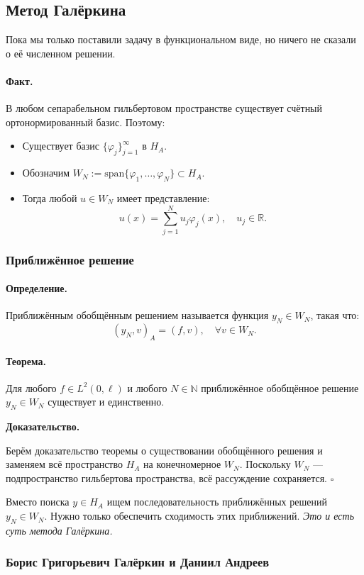 \subsection{Метод Галёркина}
Пока мы только поставили задачу в функциональном виде, но ничего не сказали о её численном решении.
\paragraph{Факт.} В любом сепарабельном гильбертовом пространстве существует счётный ортонормированный базис. Поэтому:
\begin{itemize}
  \item Существует базис $\{\varphi_j\}_{j=1}^\infty$ в $H_A$.
  \item Обозначим $W_N := \mathrm{span}\{\varphi_1, \dots, \varphi_N\} \subset H_A$.
  \item Тогда любой $u \in W_N$ имеет представление:
  \[
  u(x) = \sum_{j=1}^N u_j \varphi_j(x), \quad u_j \in \mathbb{R}.
  \]
\end{itemize}

\subsubsection{Приближённое решение}
\paragraph{Определение.} Приближённым обобщённым решением называется функция $y_N \in W_N$, такая что:
\[
(y_N, v)_A = (f, v), \quad \forall v \in W_N.
\]

\paragraph{Теорема.} Для любого $f \in L^2(0,\ell)$ и любого $N \in \mathbb{N}$ приближённое обобщённое решение $y_N \in W_N$ существует и единственно.

\textbf{Доказательство.}

Берём доказательство теоремы о существовании обобщённого решения и заменяем всё пространство $H_A$ на конечномерное $W_N$. Поскольку $W_N$ — подпространство гильбертова пространства, всё рассуждение сохраняется.
\hfill $\square$

Вместо поиска $y \in H_A$ ищем последовательность приближённых решений $y_N \in W_N$. Нужно только обеспечить сходимость этих приближений.
\textit{Это и есть суть метода Галёркина.}

\subsubsection{Борис Григорьевич Галёркин и Даниил Андреев}

